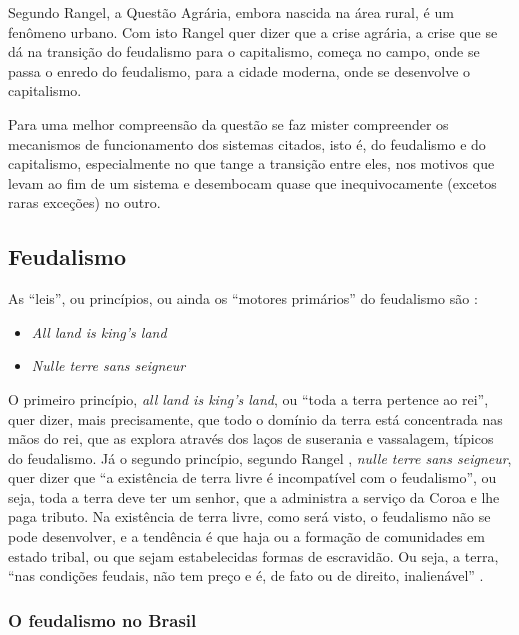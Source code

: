 \documentclass[
	12pt,				%
	oneside,			%
	a4paper,			%
	chapter=TITLE,		%
	section=TITLE,		%
	english,			%
	brazil				%
	]{abntex2}
\begin{document}
Segundo Rangel, a Questão Agrária, embora nascida na área rural, é um
fenômeno urbano. Com isto Rangel quer dizer que a crise agrária, a crise
que se dá na transição do feudalismo para o capitalismo, começa no
campo, onde se passa o enredo do feudalismo, para a cidade moderna, onde
se desenvolve o capitalismo.

Para uma melhor compreensão da questão se faz mister compreender os
mecanismos de funcionamento dos sistemas citados, isto é, do feudalismo
e do capitalismo, especialmente no que tange a transição entre eles, nos
motivos que levam ao fim de um sistema e desembocam quase que
inequivocamente (excetos raras exceções) no outro.

\subsection{Feudalismo}\label{feudalismo}

As ``leis'', ou princípios, ou ainda os ``motores primários'' do
feudalismo são \autocite[126]{rangel1985}:
\begin{itemize}
\tightlist
\item
  \emph{All land is king's land}
\item
  \emph{Nulle terre sans seigneur}
\end{itemize}
O primeiro princípio, \emph{all land is king's land}, ou ``toda a terra
pertence ao rei'', quer dizer, mais precisamente, que todo o domínio da
terra está concentrada nas mãos do rei, que as explora através dos laços
de suserania e vassalagem, típicos do feudalismo. Já o segundo
princípio, segundo Rangel \autocite*[219]{rangel1961}, \emph{nulle terre
sans seigneur}, quer dizer que ``a existência de terra livre é
incompatível com o feudalismo'', ou seja, toda a terra deve ter um
senhor, que a administra a serviço da Coroa e lhe paga tributo. Na
existência de terra livre, como será visto, o feudalismo não se pode
desenvolver, e a tendência é que haja ou a formação de comunidades em
estado tribal, ou que sejam estabelecidas formas de escravidão. Ou seja,
a terra, ``nas condições feudais, não tem preço e é, de fato ou de
direito, inalienável'' \autocite[206]{rangel1960}.

\subsubsection{O feudalismo no Brasil}\label{o-feudalismo-no-brasil}
\end{document}
